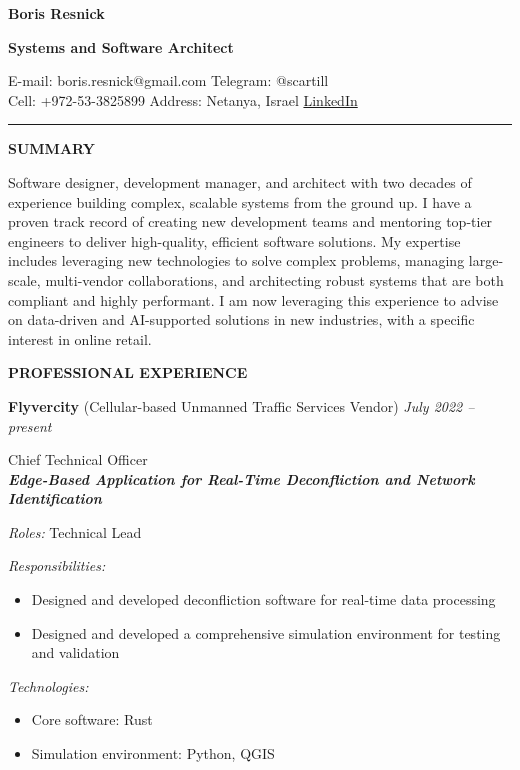 \documentclass[a4paper]{article}
\newcommand{\project}[4]{

	\textbf{\textit{#1}}
    \vspace{2mm}

    \textit{Roles:} #2
    \vspace{2mm}

    \textit{Responsibilities:}
	\begin{itemize}
	    \setlength{\itemindent}{.5cm}
	    #3
    \end{itemize}
    
	\textit{Technologies:}
	\begin{itemize}
		\setlength{\itemindent}{.5cm}
		#4
	\end{itemize}
}
\begin{document}
    \thispagestyle{empty}
    
	\begin{center}
		{\Large \textbf{Boris Resnick}\par}
		\vspace{2mm}
		{\large \textbf{Systems and Software Architect}\par}
		\vspace{1.5mm}
		E-mail: boris.resnick@gmail.com \vspace{1.5mm} \quad \quad
		Telegram: @scartill \\
		Cell: +972-53-3825899 \quad \quad
		Address: Netanya, Israel \quad \quad \href{https://www.linkedin.com/in/boris-resnick/}{LinkedIn}
	\end{center}
	\vspace{-2mm}
	\rule{\textwidth}{1pt}
	\vspace{2mm}

	\textbf{SUMMARY}
	\vspace{5mm}

	Software designer, development manager, and architect with two decades of experience building complex, scalable systems from the ground up. I have a proven track record of creating new development teams and mentoring top-tier engineers to deliver high-quality, efficient software solutions. My expertise includes leveraging new technologies to solve complex problems, managing large-scale, multi-vendor collaborations, and architecting robust systems that are both compliant and highly performant. I am now leveraging this experience to advise on data-driven and AI-supported solutions in new industries, with a specific interest in online retail.
    
    \vspace{5mm}
	\textbf{PROFESSIONAL EXPERIENCE}
	\vspace{5mm}

	\textbf{Flyvercity} (Cellular-based Unmanned Traffic Services Vendor) \hfill \textit{July 2022 -- present}

    \vspace{2mm}
	Chief Technical Officer\\

	\project{Edge-Based Application for Real-Time Deconfliction and Network Identification}{
		Technical Lead
	}{
		\item Designed and developed deconfliction software for real-time data processing
		\item Designed and developed a comprehensive simulation environment for testing and validation
	}{
		\item Core software: Rust
		\item Simulation environment: Python, QGIS
	}
\end{document}
